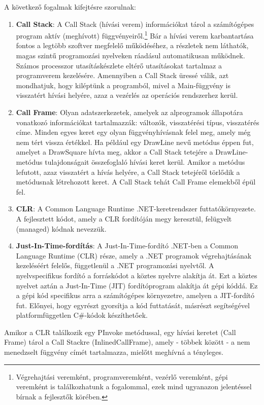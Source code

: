 \documentclass[tocnopagenum]{thesis-ekf}
\theoremstyle{definition}
\theoremstyle{remark}
\begin{document}
	A következő fogalmak kifejtésre szorulnak:
	\begin{enumerate}
		\item \textbf{Call Stack}: A Call Stack (hívási verem) információkat tárol a számítógépes program aktív (meghívott) függvényeiről.\footnote{Végrehajtási veremként, programveremként, vezérlő veremként, gépi veremként is találkozhatunk a fogalommal, ezek mind ugyanazon jelentéssel bírnak a fejlesztők körében.} Bár a hívási verem karbantartása fontos a legtöbb szoftver megfelelő működéséhez, a részletek nem láthatók, magas szintű programozási nyelveken ráadásul automatikusan működnek. Számos processzor utasításkészlete eltérő utasításokat tartalmaz a programverem kezelésére. Amennyiben a Call Stack üressé válik, azt mondhatjuk, hogy kiléptünk a programból, mivel a Main-függvény is visszatért hívási helyére, azaz a vezérlés az operációs rendszerhez kerül.
		\cite{callstack}
		\item \textbf{Call Frame}: Olyan adatszerkezetek, amelyek az alprogramok állapotára vonatkozó információkat tartalmazzák: változók, visszatérési típus, visszatérés címe. Minden egyes keret egy olyan függvényhívásnak felel meg, amely még nem tért vissza értékkel. Ha például egy DrawLine nevű metódus éppen fut, amelyet a DrawSquare hívta meg, akkor a Call Stack tetejére a DrawLine-metódus tulajdonságait összefoglaló hívási keret kerül. Amikor a metódus lefutott, azaz visszatért a hívás helyére, a Call Stack tetejéről törlődik a metódusnak létrehozott keret. A Call Stack tehát Call Frame elemekből épül fel.
		\cite{callstack}
		\item \textbf{CLR}: A Common Language Runtime .NET-keretrendszer futtatókörnyezete. A fejlesztett kódot, amely a CLR fordítóján megy keresztül, felügyelt (managed) kódnak nevezzük.
		\cite{clr}
		\item \textbf{Just-In-Time-fordítás}: A Just-In-Time-fordító .NET-ben a Common Language Runtime (CLR) része, amely a .NET programok végrehajtásának kezeléséért felelős, függetlenül a .NET programozási nyelvtől. A nyelvspecifikus fordító a forráskódot a köztes nyelvre alakítja át. Ezt a köztes nyelvet aztán a Just-In-Time (JIT) fordítóprogram alakítja át gépi kóddá. Ez a gépi kód specifikus arra a számítógépes környezetre, amelyen a JIT-fordító fut. Előnyei, hogy egyrészt gyorsítja a kód futtatását, másrészt segítségével platformfüggetlen C\#-kódok készíthetőek.
		\cite{jit_compiler}
	\end{enumerate}

	Amikor a CLR találkozik egy PInvoke metódussal, egy hívási keretet (Call Frame) tárol a Call Stackre (InlinedCallFrame), amely - többek között - a nem menedzselt függvény címét tartalmazza, mielőtt meghívná a tényleges.
	
\end{document}
